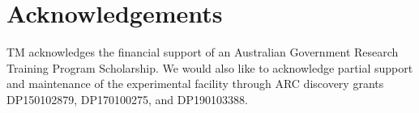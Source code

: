 \documentclass[3p]{elsarticle}
\begin{document}
\section*{Acknowledgements}
TM acknowledges the financial support of an Australian Government
Research Training Program Scholarship. We would also like to
acknowledge partial support and maintenance of the experimental
facility through ARC discovery grants DP150102879, DP170100275, and
DP190103388.


\end{document}
